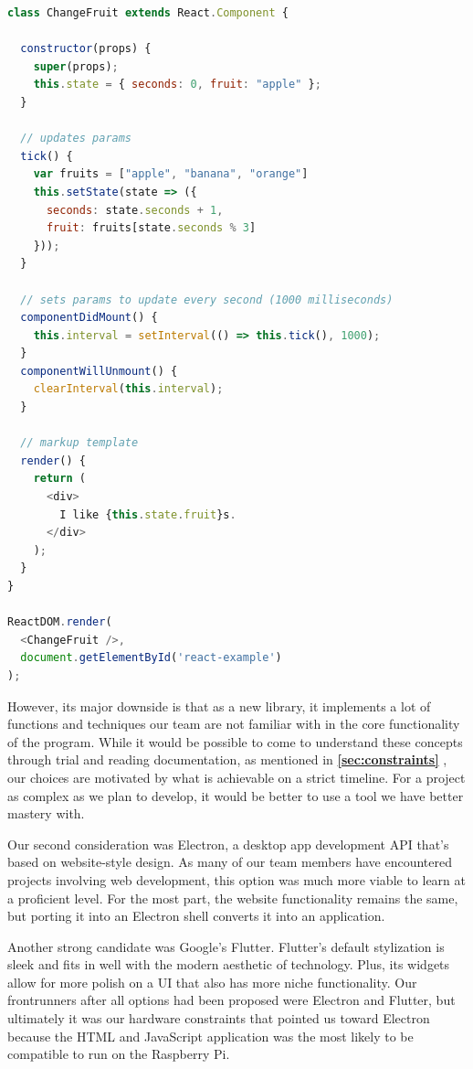 \begin{lstlisting}[language=JavaScript, caption={A simple program made to test React during the
selection process; it focuses on demonstrating how React automatically updates the HTML layer},
label=lis:react]
class ChangeFruit extends React.Component {

  constructor(props) {
    super(props);
    this.state = { seconds: 0, fruit: "apple" };
  }

  // updates params
  tick() {
    var fruits = ["apple", "banana", "orange"]
    this.setState(state => ({
      seconds: state.seconds + 1,
      fruit: fruits[state.seconds % 3]
    }));
  }

  // sets params to update every second (1000 milliseconds)
  componentDidMount() {
    this.interval = setInterval(() => this.tick(), 1000);
  }
  componentWillUnmount() {
    clearInterval(this.interval);
  }

  // markup template
  render() {
    return (
      <div>
        I like {this.state.fruit}s.
      </div>
    );
  }
}

ReactDOM.render(
  <ChangeFruit />,
  document.getElementById('react-example')
);
\end{lstlisting}

However, its major downside is that as a new library, it implements a lot of functions and
techniques our team are not familiar with in the core functionality of the program. While it would
be possible to come to understand these concepts through trial and reading documentation, as
mentioned in \textbf{\ref{sec:constraints} }, our choices are motivated by
what is achievable on a strict timeline. For a project as complex as we plan to develop, it would
be better to use a tool we have better mastery with.

Our second consideration was Electron, a desktop app development API that’s based on website-style
design. As many of our team members have encountered projects involving web development, this
option was much more viable to learn at a proficient level. For the most part, the website
functionality remains the same, but porting it into an Electron shell converts it into an
application.

Another strong candidate was Google’s Flutter. Flutter’s default stylization is sleek and fits in
well with the modern aesthetic of technology. Plus, its widgets allow for more polish on a UI that
also has more niche functionality. Our frontrunners after all options had been proposed were
Electron and Flutter, but ultimately it was our hardware constraints that pointed us toward
Electron because the HTML and JavaScript application was the most likely to be compatible to run on
the Raspberry Pi.

